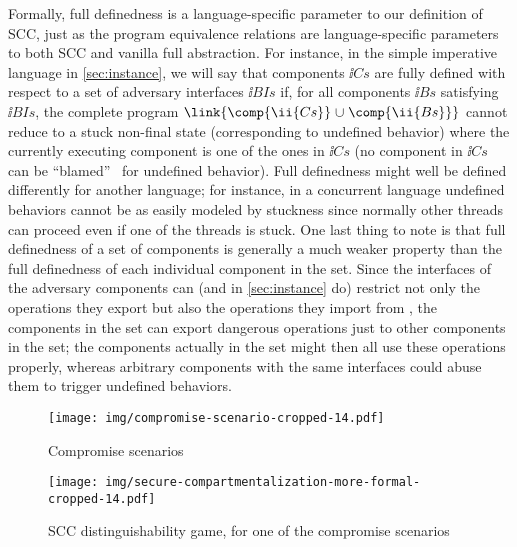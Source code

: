 \documentclass[10pt, conference, compsocconf, letterpaper, times]{IEEEtran}
\begin{document}
Formally, full definedness is a language-specific parameter to our
definition of SCC, just as the program equivalence relations are
language-specific parameters to both SCC and vanilla full abstraction.
For instance, in the simple imperative language in
\autoref{sec:instance}, we will say that components $\ii{Cs}$
are fully defined with respect to a set of adversary interfaces
$\ii{BIs}$ if, for all components $\ii{Bs}$ 
satisfying $\ii{BIs}$, the complete program
$\link{\comp{\ii{Cs}} \mathrel{\cup} \comp{\ii{Bs}}}$ cannot reduce
to a stuck non-final state (corresponding to undefined behavior) where
the currently executing component is one of the ones in
$\ii{Cs}$ (\IE no component in $\ii{Cs}$ can be
``blamed''~\cite{FindlerF02prime} for undefined behavior).
Full definedness might well be defined differently for another
language; for instance, in a concurrent language undefined behaviors
cannot be as easily modeled by stuckness since normally other threads
can proceed even if one of the threads is stuck.
One last thing to note is that full definedness of a set of components is
generally a much weaker property than the full definedness of each
individual component in the set. Since the interfaces of
the adversary components  can (and in \autoref{sec:instance} do)
restrict not only the operations they export but also the operations they
import from , the components in the set can export dangerous
operations just to other components in the set; the components actually in
the set might then all use these operations properly, whereas arbitrary
components with the same interfaces could abuse them to trigger undefined
behaviors.



\begin{figure}
\centering
\texttt{[image: img/compromise-scenario-cropped-14.pdf]}
\caption{Compromise scenarios}
\label{fig:compromise-scenario}
\end{figure}
\begin{figure}[t!]
\centering
\texttt{[image: img/secure-compartmentalization-more-formal-cropped-14.pdf]}
\caption{SCC distinguishability game, for one of the
  compromise scenarios\ifsooner{}\fi}
\label{fig:secure-compartmentalization-more-formal}
\end{figure}
\end{document}
